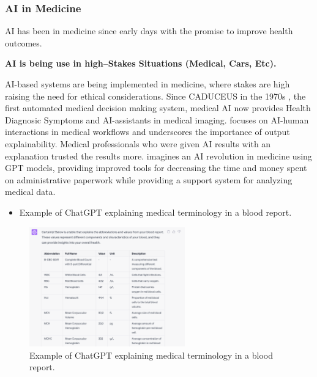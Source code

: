 \documentclass[
  letterpaper,
  DIV=11,
  numbers=noendperiod]{scrartcl}
\providecommand{\tightlist}{%
  \setlength{\itemsep}{0pt}\setlength{\parskip}{0pt}}\usepackage{longtable,booktabs,array}
\begin{document}
\subsubsection{AI in Medicine}\label{ai-in-medicine}

AI has been in medicine since early days with the promise to improve
health outcomes.

\textbf{AI is being use in high--Stakes Situations (Medical, Cars,
Etc).}

AI-based systems are being implemented in medicine, where stakes are
high raising the need for ethical considerations. Since CADUCEUS in the
1970s \citep[in][]{kanzaAIScientificDiscovery2021}, the first automated
medical decision making system, medical AI now provides Health Diagnosic
Symptoms and AI-assistants in medical imaging.
\citep{calistoBreastScreeningAIEvaluatingMedical2022} focuses on
AI-human interactions in medical workflows and underscores the
importance of output explainability. Medical professionals who were
given AI results with an explanation trusted the results more.
\citep{leeAIRevolutionMedicine2023} imagines an AI revolution in
medicine using GPT models, providing improved tools for decreasing the
time and money spent on administrative paperwork while providing a
support system for analyzing medical data.

\begin{itemize}
\tightlist
\item
  Example of ChatGPT explaining medical terminology in a blood report.
\end{itemize}

\begin{figure}[H]

{\centering \includegraphics[width=0.6\textwidth,height=\textheight]{./images/chatgpt-medical.png}

}

\caption{Example of ChatGPT explaining medical terminology in a blood
report.}

\end{figure}%
\end{document}
